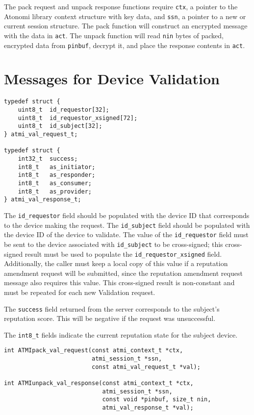 The pack request and unpack response functions require \texttt{ctx}, a pointer
to the Atonomi library context structure with key data, and \texttt{ssn},
a pointer to a new or current session structure. The pack function will
construct an encrypted message with the data in \texttt{act}. The unpack function
will read \texttt{nin} bytes of packed, encrypted data from \texttt{pinbuf},
decrypt it, and place the response contents in \texttt{act}.



\section{Messages for Device Validation}
\begin{lstlisting}[name=Validation Request and Response Structures]
typedef struct {
	uint8_t  id_requestor[32];
	uint8_t  id_requestor_xsigned[72];
	uint8_t  id_subject[32];
} atmi_val_request_t;

typedef struct {
	int32_t  success;
	int8_t   as_initiator;
	int8_t   as_responder;
	int8_t   as_consumer;
	int8_t   as_provider;
} atmi_val_response_t;
\end{lstlisting}

The \texttt{id_requestor} field should be populated with the device ID that
corresponds to the device making the request. The \texttt{id_subject} field
should be populated with the device ID of the device to validate. The value
of the \texttt{id_requestor} field must be sent to the device associated with
\texttt{id_subject} to be cross-signed; this cross-signed result must be used
to populate the \texttt{id_requestor_xsigned} field. Additionally, the caller
must keep a local copy of this value if a reputation amendment request will be
submitted, since the reputation amendment request message also requires this
value. This cross-signed result is non-constant and must be repeated for
each new Validation request.

The \texttt{success} field returned from the server corresponds to the
subject's reputation score. This will be negative if the request was unsuccessful.

The \texttt{int8_t} fields indicate the current reputation state for the
subject device.

\pagebreak
\begin{lstlisting}[name=Validation Request Packing and Response Unpacking Functions]
int ATMIpack_val_request(const atmi_context_t *ctx,
                         atmi_session_t *ssn,
                         const atmi_val_request_t *val);

int ATMIunpack_val_response(const atmi_context_t *ctx,
                            atmi_session_t *ssn,
                            const void *pinbuf, size_t nin,
                            atmi_val_response_t *val);
\end{lstlisting}

